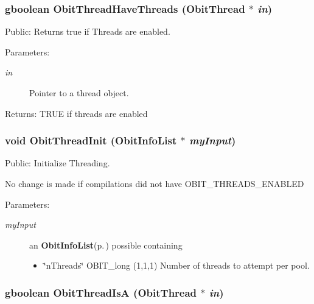 \subsubsection{\setlength{\rightskip}{0pt plus 5cm}gboolean Obit\-Thread\-Have\-Threads ({\bf Obit\-Thread} $\ast$ {\em in})}\label{ObitThread_8c_a18}


Public: Returns true if Threads are enabled. 

\begin{Desc}
\item[Parameters:]
\begin{description}
\item[{\em in}]Pointer to a thread object. \end{description}
\end{Desc}
\begin{Desc}
\item[Returns:]TRUE if threads are enabled \end{Desc}
\subsubsection{\setlength{\rightskip}{0pt plus 5cm}void Obit\-Thread\-Init ({\bf Obit\-Info\-List} $\ast$ {\em my\-Input})}\label{ObitThread_8c_a19}


Public: Initialize Threading. 

No change is made if compilations did not have OBIT\_\-THREADS\_\-ENABLED \begin{Desc}
\item[Parameters:]
\begin{description}
\item[{\em my\-Input}]an {\bf Obit\-Info\-List}{\rm (p.\,\pageref{structObitInfoList})} possible containing \begin{itemize}
\item \char`\"{}n\-Threads\char`\"{} OBIT\_\-long (1,1,1) Number of threads to attempt per pool. \end{itemize}
\end{description}
\end{Desc}
\subsubsection{\setlength{\rightskip}{0pt plus 5cm}gboolean Obit\-Thread\-Is\-A ({\bf Obit\-Thread} $\ast$ {\em in})}\label{ObitThread_8c_a17}


